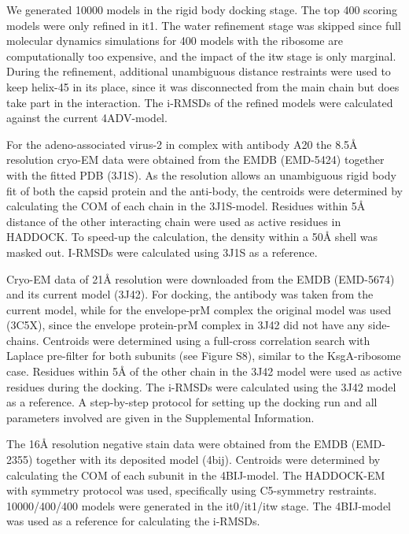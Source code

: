 We generated 10000 models in the rigid body docking stage. 
The top 400 scoring models were only refined in it1. 
The water refinement stage was skipped since full molecular dynamics simulations for 400 models with the ribosome are computationally too expensive, and the impact of the itw stage is only marginal. 
During the refinement, additional unambiguous distance restraints were used to keep helix-45 in its place, since it was disconnected from the main chain but does take part in the interaction. 
The i-RMSDs of the refined models were calculated against the current 4ADV-model.


For the adeno-associated virus-2 in complex with antibody A20 the 8.5Å resolution cryo-EM data were obtained from the EMDB (EMD-5424) together with the fitted PDB (3J1S). 
As the resolution allows an unambiguous rigid body fit of both the capsid protein and the anti-body, the centroids were determined by calculating the COM of each chain in the 3J1S-model. 
Residues within 5Å distance of the other interacting chain were used as active residues in HADDOCK. 
To speed-up the calculation, the density within a 50Å shell was masked out. 
I-RMSDs were calculated using 3J1S as a reference. 


Cryo-EM data of 21Å resolution were downloaded from the EMDB (EMD-5674) and its current model (3J42). 
For docking, the antibody was taken from the current model, while for the envelope-prM complex the original model was used (3C5X), since the envelope protein-prM complex in 3J42 did not have any side-chains. 
Centroids were determined using a full-cross correlation search with Laplace pre-filter for both subunits (see Figure S8), similar to the KsgA-ribosome case. 
Residues within 5Å of the other chain in the 3J42 model were used as active residues during the docking. 
The i-RMSDs were calculated using the 3J42 model as a reference. 
A step-by-step protocol for setting up the docking run and all parameters involved are given in the Supplemental Information.


The 16Å resolution negative stain data were obtained from the EMDB (EMD-2355) together with its deposited model (4bij). 
Centroids were determined by calculating the COM of each subunit in the 4BIJ-model. 
The HADDOCK-EM with symmetry protocol was used, specifically using C5-symmetry restraints. 
10000/400/400 models were generated in the it0/it1/itw stage. 
The 4BIJ-model was used as a reference for calculating the i-RMSDs. 

